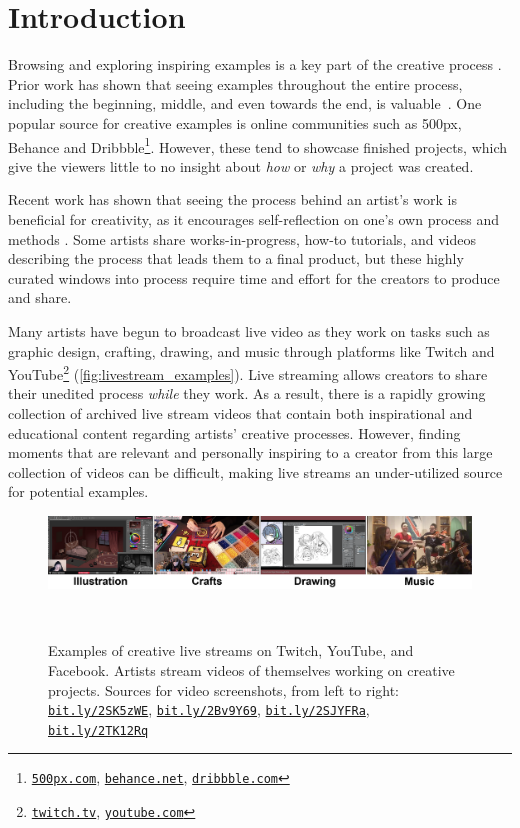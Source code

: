 \section{Introduction}
Browsing and exploring inspiring examples is a key part of the creative process \cite{Shneiderman2007, Shneiderman2002, Greene2002, Herring2009, Bawden1986}. Prior work has shown that seeing examples throughout the entire process, including the beginning, middle, and even towards the end, is valuable~\cite{Kulkarni2014, Siangliulue2015}. One popular source for creative examples is online communities such as 500px, Behance and Dribbble\footnote{\href{https://500px.com}{\nolinkurl{500px.com}}, \href{https://behance.net}{\nolinkurl{behance.net}}, \href{https://dribbble.com}{\nolinkurl{dribbble.com}}}. However, these tend to showcase finished projects, which give the viewers little to no insight about \textit{how} or \textit{why} a project was created. 

Recent work has shown that seeing the process behind an artist's work is beneficial for creativity, as it encourages self-reflection on one's own process and methods \cite{Kim2017}. Some artists share works-in-progress, how-to tutorials, and videos describing the process that leads them to a final product, but these highly curated windows into process require time and effort for the creators to produce and share. 

Many artists have begun to broadcast live video as they work on tasks such as graphic design, crafting, drawing, and music through platforms like Twitch and YouTube\footnote{\href{www.twitch.tv}{\nolinkurl{twitch.tv}}, \href{www.youtube.com}{\nolinkurl{youtube.com}}} (\autoref{fig:livestream_examples}). Live streaming allows creators to share their unedited process \emph{while} they work. As a result, there is a rapidly growing collection of archived live stream videos that contain both inspirational and educational content regarding artists' creative processes. However, finding moments that are relevant and personally inspiring to a creator from this large collection of videos can be difficult, making live streams an under-utilized source for potential examples.

\begin{figure}[t!]
\centering
  \includegraphics[width=\textwidth]{liveclips/figures/examples-horizontal.png}
  \caption{Examples of creative live streams on Twitch, YouTube, and Facebook. Artists stream videos of themselves working on creative projects. Sources for video screenshots, from left to right: \href{http://bit.ly/2SK5zWE}{\nolinkurl{bit.ly/2SK5zWE}}, \href{http://bit.ly/2Bv9Y69}{\nolinkurl{bit.ly/2Bv9Y69}}, \href{http://bit.ly/2SJYFRa}{\nolinkurl{bit.ly/2SJYFRa}}, \href{http://bit.ly/2TK12Rq}{\nolinkurl{bit.ly/2TK12Rq}}}~\label{fig:livestream_examples}
\end{figure}

